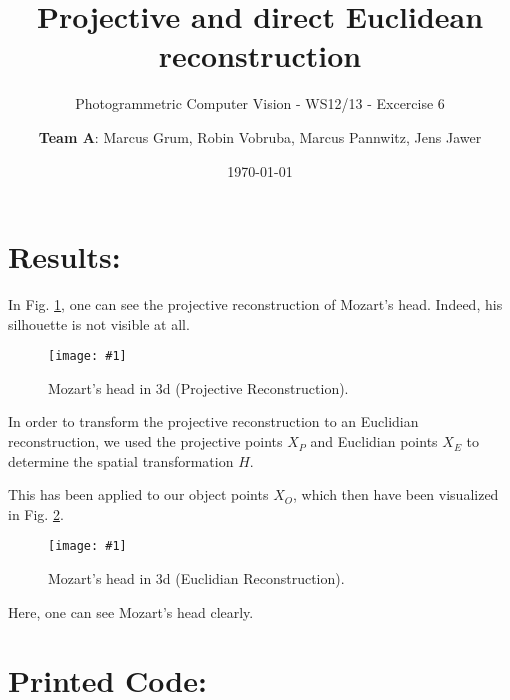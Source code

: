 \documentclass[a4paper,headings=small]{scrartcl}
\title{Projective and direct Euclidean reconstruction}
\subtitle{Photogrammetric Computer Vision - WS12/13 - Excercise 6}
\author{\textbf{Team A}: Marcus Grum, Robin Vobruba, Marcus Pannwitz, Jens Jawer}
\date{\today}
\numberwithin{equation}{section} %
\numberwithin{figure}{section}   %
\newcommand{\image}[3]{
	\begin{figure}[htbp]
		\centering
		\texttt{[image: \#1]}
		\caption{#3}
		\label{fig:#1}
	\end{figure}
}
\newcommand{\imgRootGenerated}{../../../target}
\begin{document}
\maketitle

\section{Results:}

In Fig. \ref{fig:\imgRootGenerated/projectiveReconstruction.png}, one can see the projective reconstruction
of Mozart's head. Indeed, his silhouette is not visible at all.

\image{\imgRootGenerated/projectiveReconstruction.png}{0.6}{%
		Mozart's head in 3d (Projective Reconstruction).}

In order to transform the projective reconstruction to an Euclidian reconstruction,
we used the projective points $X_P$ and Euclidian points $X_E$
to determine the spatial transformation $H$.

This has been applied to our object points $X_O$, which then have been visualized
in Fig. \ref{fig:\imgRootGenerated/euclidianReconstruction.png}.

\image{\imgRootGenerated/euclidianReconstruction.png}{0.6}{%
		Mozart's head in 3d (Euclidian Reconstruction).}

Here, one can see Mozart's head clearly.

\newpage
\section{Printed Code:}


\end{document}
